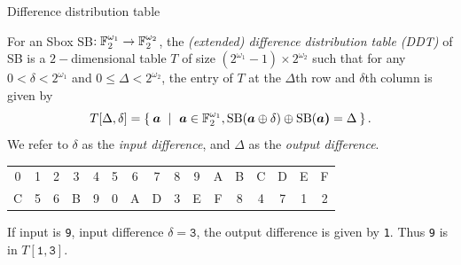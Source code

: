 \begin{frame}{Difference distribution table}
    \begin{definition}
    For an Sbox SB$:{\mathbb F}_2^{\omega_1}\to{\mathbb F}_2^{\omega_2}$, the \textit{(extended) difference distribution table (DDT)} of SB is a $2-$dimensional table $T$ of size $(2^{\omega_1}-1)\times2^{\omega_2}$ such that for any $0<\delta<2^{\omega_1}$ and $0\leq\Delta<2^{\omega_2}$, the entry of $T$ at the $\Delta$th row and $\delta$th column is given by
    \[
    T[\Delta,\delta]=\Set{\boldsymbol{a}\ |\ \boldsymbol{a}\in\FF_2^{\omega_1}, \text{SB}(\boldsymbol{a}\oplus \delta)\oplus \text{SB}(\boldsymbol{a)}=\Delta}.
    \]
    We refer to $\delta$ as the \textit{input difference}, and $\Delta$ as the \textit{output difference}.
\end{definition}
\begin{example}
\begin{table}
\begin{tabular}{cccccccccccccccc}\hline
0 & 1 & 2 & 3 & 4 & 5 & 6 & 7 & 8 & 9 & A & B & C & D & E & F \\
C & 5 & 6 & B & 9 & 0 & A & D & 3 & E & F & 8 & 4 & 7 & 1 & 2\\\hline
\end{tabular}
\end{table}
If input is \texttt{9}, input difference $\delta=\texttt{3}$, the output difference is given by \texttt{1}.
Thus \texttt{9} is in $T[\texttt{1},\texttt{3}]$.
\end{example}
\end{frame}

